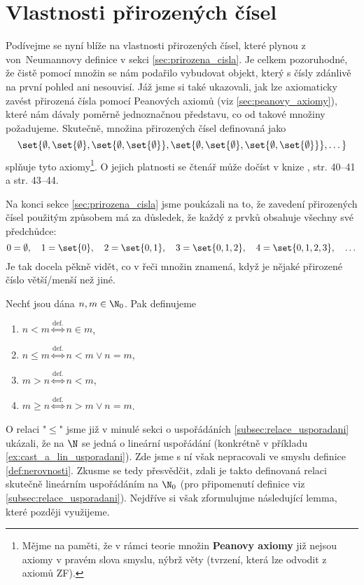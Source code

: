 \section{Vlastnosti přirozených čísel}\label{sec:vlastnosti_prirozenych_cisel}
Podívejme se nyní blíže na vlastnosti přirozených čísel, které plynou z von~Neumannovy definice v sekci \ref{sec:prirozena_cisla}. Je celkem pozoruhodné, že čistě pomocí množin se nám podařilo vybudovat objekt, který s čísly zdánlivě na první pohled ani nesouvisí. Jáž jsme si také ukazovali, jak lze axiomaticky zavést přirozená čísla pomocí Peanových axiomů (viz \ref{sec:peanovy_axiomy}), které nám dávaly poměrně jednoznačnou představu, co od takové množiny požadujeme. Skutečně, množina přirozených čísel definovaná jako
\begin{equation*}
    \set{\emptyset,\set{\emptyset},\set{\emptyset,\set{\emptyset}},\set{\emptyset,\set{\emptyset},\set{\emptyset,\set{\emptyset}}},\dots}
\end{equation*}
splňuje tyto axiomy\footnote{Mějme na paměti, že v rámci teorie množin \textbf{Peanovy axiomy} již nejsou axiomy v pravém slova smyslu, nýbrž věty (tvrzení, která lze odvodit z axiomů ZF).}. O jejich platnosti se čtenář může dočíst v knize \cite{Goldrei2017}, str. 40--41 a str. 43--44.\par
Na konci sekce \ref{sec:prirozena_cisla} jsme poukázali na to, že zavedení přirozených čísel použitým způsobem má za důsledek, že každý z prvků obsahuje všechny své předchůdce:
\begin{equation*}
    0=\emptyset,\quad 1=\set{0},\quad 2=\set{0,1},\quad 3=\set{0,1,2},\quad 4=\set{0,1,2,3},\quad\dots
\end{equation*}
Je tak docela pěkně vidět, co v řeči množin znamená, když je nějaké přirozené číslo větší/menší než jiné.
\begin{definition}\label{def:nerovnosti}
    Nechť jsou dána $n,m\in\N_0$. Pak definujeme
    \begin{enumerate}[label=(\roman*)]
        \item $n<m\stackrel{\text{def.}}{\iff}n\in m$,
        \item $n\leq m\stackrel{\text{def.}}{\iff}n<m\lor n=m$,
        \item $m>n\stackrel{\text{def.}}{\iff}n<m$,
        \item $m\geq n\stackrel{\text{def.}}{\iff}n>m\lor n=m$.
    \end{enumerate}
\end{definition}
O relaci "$\leq$" jsme již v minulé sekci o uspořádáních \ref{subsec:relace_usporadani} ukázali, že na $\N$ se jedná o lineární uspořádání (konkrétně v příkladu \ref{ex:cast_a_lin_usporadani}). Zde jsme s ní však nepracovali ve smyslu definice \ref{def:nerovnosti}. Zkusme se tedy přesvědčit, zdali je takto definovaná relaci skutečně lineárním uspořádáním na $\N_0$ (pro připomenutí definice viz \ref{subsec:relace_usporadani}). Nejdříve si však zformulujme následující lemma, které později využijeme.
